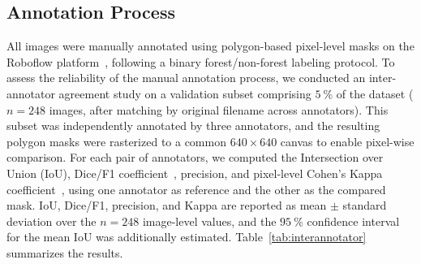 \documentclass[journal,article,submit,pdftex,moreauthors]{Definitions/mdpi}
\begin{document}
\begin{table}[t]
\centering
\caption{Inter-annotator agreement on the validation subset ($n=248$ images).}
\label{tab:interannotator}
\end{table}

\subsection{Annotation Process}

All images were manually annotated using polygon-based pixel-level masks on the Roboflow platform~\cite{roboflow2026defortrack}, following a binary forest/non-forest labeling protocol. To assess the reliability of the manual annotation process, we conducted an inter-annotator agreement study on a validation subset comprising $5~\%$ of the dataset ($n=248$ images, after matching by original filename across annotators). This subset was independently annotated by three annotators, and the resulting polygon masks were rasterized to a common $640 \times 640$ canvas to enable pixel-wise comparison. For each pair of annotators, we computed the Intersection over Union (IoU), Dice/F1 coefficient~\cite{dice1945measures}, precision, and pixel-level Cohen's Kappa coefficient~\cite{wan2015kappa}, using one annotator as reference and the other as the compared mask. IoU, Dice/F1, precision, and Kappa are reported as mean $\pm$ standard deviation over the $n=248$ image-level values, and the $95~\%$ confidence interval for the mean IoU was additionally estimated. Table~\ref{tab:interannotator} summarizes the results.
 
\end{document}
